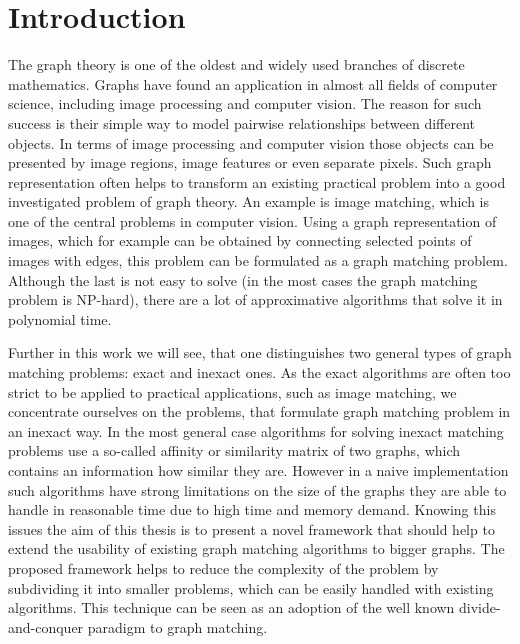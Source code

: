 \chapter{Introduction}
The graph theory is one of the oldest and widely used branches of discrete mathematics. Graphs have found an application in almost all fields of computer science, including image processing and computer vision. The reason for such success is their simple way to model pairwise relationships between different objects. In terms of image processing and computer vision those objects can be presented by image regions, image features or even separate pixels. Such graph representation often helps to transform an existing practical problem into a good investigated problem of graph theory. An example is image matching, which is one of the central problems in computer vision. %
Using a graph representation of images, which for example can be obtained by connecting selected points of images with edges, this problem can be formulated as a graph matching problem. Although the last is not easy to solve (in the most cases the graph matching problem is NP-hard), there are a lot of approximative algorithms that solve it in polynomial time.

Further in this work we will see, that one distinguishes two general types of graph matching problems: exact and inexact ones. As the exact algorithms are often too strict to be applied to practical applications, such as image matching, we concentrate ourselves on the problems, that formulate graph matching problem in an inexact way.
In the most general case algorithms for solving inexact matching problems use a so-called affinity or similarity matrix of two graphs, which contains an information how similar they are.
However in a naive implementation such algorithms have strong limitations on the size of the graphs they are able to handle in reasonable time due to high time and memory demand. Knowing this issues the aim of this thesis is to present a novel framework that should help to extend the usability of existing graph matching algorithms to bigger graphs. The proposed framework helps to reduce the complexity of the problem by subdividing it into smaller problems, which can be easily handled with existing algorithms. This technique can be seen as an adoption of the well known divide-and-conquer paradigm to graph matching.

